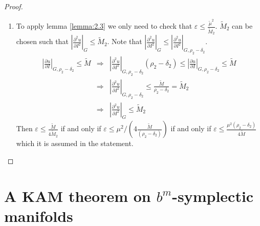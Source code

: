 \begin{proof}
\begin{enumerate}
\item To apply lemma \ref{lemma:2.3} we only need to check that $\varepsilon \leq \frac{\tilde \mu ^2}{ \tilde M_2}$.
$\tilde M_2$ can be chosen such that $|\frac{\partial^2 u}{\partial I^2}|_G \leq \tilde M_2$. Note that $|\frac{\partial^2 u}{\partial I^2}|_G \leq |\frac{\partial^2 u}{\partial I^2}|_{G,\rho_2-\delta_2}$.
$$
\begin{array}{rcl}
|\frac{\partial u}{\partial I}|_{G,\rho_2-\delta_2} \leq \tilde M & \Rightarrow & |\frac{\partial^2 u}{\partial I^2}|_{G, \rho_2-\delta_2}(\rho_2-\delta_2) \leq |\frac{\partial u}{\partial I}|_{G,\rho_2-\delta_2} \leq \tilde M\\
 & \Rightarrow & |\frac{\partial^2 u}{\partial I ^2}|_{G,\rho_2-\delta_2} \leq \frac{\tilde M}{\rho_2-\delta_2} = \tilde M_2\\
 & \Rightarrow & |\frac{\partial^2 u}{\partial I^2}|_G \leq \tilde M_2
\end{array}
$$
Then $\varepsilon \leq \frac{\tilde M}{4 \tilde M_2}$ if and only if $\varepsilon \leq \mu^2/(4\frac{\tilde M}{(\rho_2 - \delta_2)})$ if and only if $\varepsilon \leq \frac{\mu^2(\rho_2-\delta_2)}{4\tilde M}$ which it is assumed in the statement.
\end{enumerate}

\end{proof}

\section{ A KAM theorem on $b^m$-symplectic manifolds}


